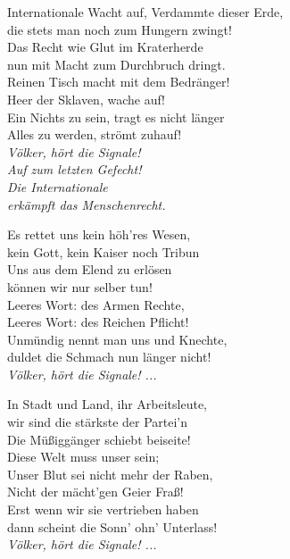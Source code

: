 
\begin{lied}{Internationale}{}
Wacht auf, Verdammte dieser Erde,\\
die stets man noch zum Hungern zwingt!\\
Das Recht wie Glut im Kraterherde\\
nun mit Macht zum Durchbruch dringt.\\
Reinen Tisch macht mit dem Bedränger!\\
Heer der Sklaven, wache auf!\\
Ein Nichts zu sein, tragt es nicht länger\\
Alles zu werden, strömt zuhauf!\\

\textit{Völker, hört die Signale!\\
Auf zum letzten Gefecht!\\
Die Internationale\\
erkämpft das Menschenrecht.\\}

Es rettet uns kein höh'res Wesen,\\
kein Gott, kein Kaiser noch Tribun\\
Uns aus dem Elend zu erlösen\\
können wir nur selber tun!\\
Leeres Wort: des Armen Rechte,\\
Leeres Wort: des Reichen Pflicht!\\
Unmündig nennt man uns und Knechte,\\
duldet die Schmach nun länger nicht!\\

\textit{Völker, hört die Signale! ...\\}

In Stadt und Land, ihr Arbeitsleute,\\
wir sind die stärkste der Partei'n\\
Die Müßiggänger schiebt beiseite!\\
Diese Welt muss unser sein;\\
Unser Blut sei nicht mehr der Raben,\\
Nicht der mächt'gen Geier Fraß!\\
Erst wenn wir sie vertrieben haben\\
dann scheint die Sonn' ohn' Unterlass!\\

\textit{Völker, hört die Signale! ...\\}

\end{lied}

